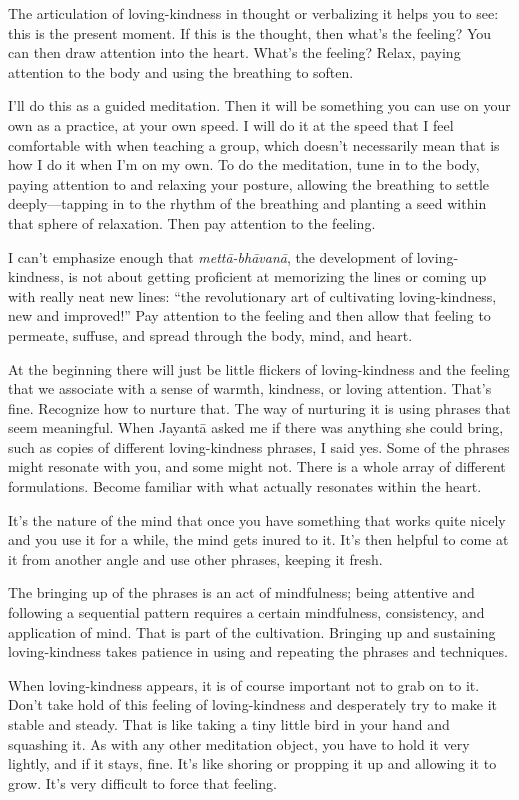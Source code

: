 The articulation of loving-kindness in thought or verbalizing it helps
you to see: this is the present moment. If this is the thought, then
what’s the feeling? You can then draw attention into the heart. What’s
the feeling? Relax, paying attention to the body and using the breathing
to soften.

I’ll do this as a guided meditation. Then it will be something you can
use on your own as a practice, at your own speed. I will do it at the
speed that I feel comfortable with when teaching a group, which doesn’t
necessarily mean that is how I do it when I’m on my own. To do the
meditation, tune in to the body, paying attention to and relaxing your
posture, allowing the breathing to settle deeply—tapping in to the
rhythm of the breathing and planting a seed within that sphere of
relaxation. Then pay attention to the feeling.

I can’t emphasize enough that \emph{mettā-bhāvanā}, the development of
loving-kindness, is not about getting proficient at memorizing the lines
or coming up with really neat new lines: “the revolutionary art of
cultivating loving-kindness, new and improved!” Pay attention to the
feeling and then allow that feeling to permeate, suffuse, and spread
through the body, mind, and heart.

At the beginning there will just be little flickers of loving-kindness
and the feeling that we associate with a sense of warmth, kindness, or
loving attention. That’s fine. Recognize how to nurture that. The way of
nurturing it is using phrases that seem meaningful. When Jayantā asked
me if there was anything she could bring, such as copies of different
loving-kindness phrases, I said yes. Some of the phrases might resonate
with you, and some might not. There is a whole array of different
formulations. Become familiar with what actually resonates within the
heart.

It’s the nature of the mind that once you have something that works
quite nicely and you use it for a while, the mind gets inured to it.
It’s then helpful to come at it from another angle and use other
phrases, keeping it fresh.

The bringing up of the phrases is an act of mindfulness; being attentive
and following a sequential pattern requires a certain mindfulness,
consistency, and application of mind. That is part of the cultivation.
Bringing up and sustaining loving-kindness takes patience in using and
repeating the phrases and techniques.

When loving-kindness appears, it is of course important not to grab on
to it. Don’t take hold of this feeling of loving-kindness and
desperately try to make it stable and steady. That is like taking a tiny
little bird in your hand and squashing it. As with any other meditation
object, you have to hold it very lightly, and if it stays, fine. It’s
like shoring or propping it up and allowing it to grow. It’s very
difficult to force that feeling.

